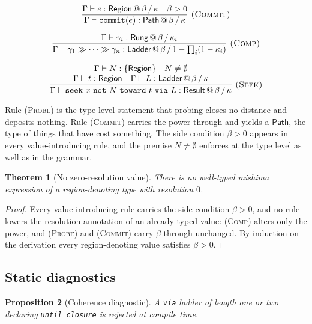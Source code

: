 \documentclass[11pt,twocolumn,a4paper]{article}
\newtheorem{theorem}{Theorem}[section]
\newtheorem{proposition}[theorem]{Proposition}
\theoremstyle{definition}
\theoremstyle{remark}
\newcommand{\flo}{\beta}
\newcommand{\pot}{\kappa}
\begin{document}
\[
\frac{\Gamma \vdash e : \textsf{Region} \,@\, \flo \,/\, \pot \quad \flo > 0}
     {\Gamma \vdash \texttt{commit}(e) : \textsf{Path} \,@\, \flo \,/\, \pot}
\ \textsc{(Commit)}
\]

\[
\frac{\Gamma \vdash \gamma_i : \textsf{Rung} \,@\, \flo \,/\, \pot_i}
     {\Gamma \vdash \gamma_1 \gg \cdots \gg \gamma_n :
      \textsf{Ladder} \,@\, \flo \,/\, 1-\prod_i(1-\pot_i)}
\ \textsc{(Comp)}
\]

\[
\frac{\begin{array}{c}
       \Gamma \vdash N : \{\textsf{Region}\} \quad N \neq \emptyset \\
       \Gamma \vdash t : \textsf{Region} \quad
       \Gamma \vdash L : \textsf{Ladder} \,@\, \flo \,/\, \pot
      \end{array}}
     {\Gamma \vdash \texttt{seek}\ x\ \texttt{not}\ N\ \texttt{toward}\ t\
       \texttt{via}\ L : \textsf{Result} \,@\, \flo \,/\, \pot}
\ \textsc{(Seek)}
\]

Rule \textsc{(Probe)} is the type-level statement that probing closes no distance
and deposits nothing. Rule \textsc{(Commit)} carries the power through and yields
a $\textsf{Path}$, the type of things that have cost something. The side
condition $\flo>0$ appears in every value-introducing rule, and the premise
$N\neq\emptyset$ enforces \Cref{prop:mandatory-not} at the type level as well as
in the grammar.

\begin{theorem}[No zero-resolution value]
\label{thm:no-zero}
There is no well-typed mishima expression of a region-denoting type with
resolution $0$.
\end{theorem}

\begin{proof}
Every value-introducing rule carries the side condition $\flo>0$, and no rule
lowers the resolution annotation of an already-typed value: \textsc{(Comp)}
alters only the power, and \textsc{(Probe)} and \textsc{(Commit)} carry $\flo$
through unchanged. By induction on the derivation every region-denoting value
satisfies $\flo>0$.
\end{proof}

\subsection{Static diagnostics}

\begin{proposition}[Coherence diagnostic]
\label{prop:cohdiag}
A \texttt{via} ladder of length one or two declaring \texttt{until closure} is
rejected at compile time.
\end{proposition}
\end{document}
